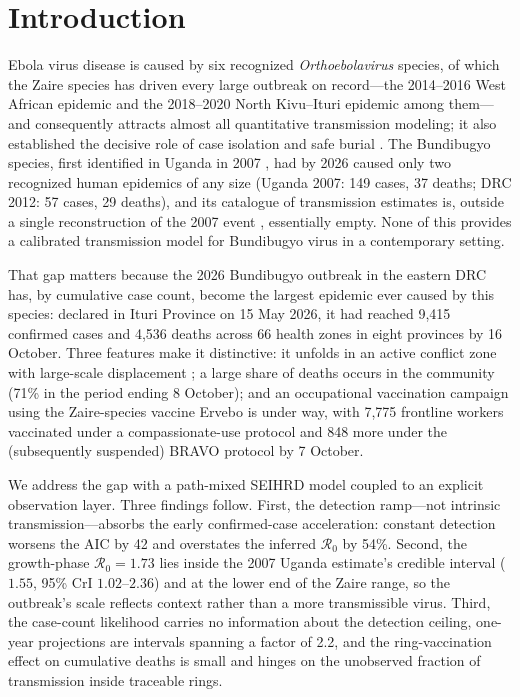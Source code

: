 \documentclass[10pt]{plos}
\newcommand{\Reff}{\mathcal{R}}
\begin{document}
\section{Introduction}\label{sec:intro}

Ebola virus disease is caused by six recognized \emph{Orthoebolavirus}
species, of which the Zaire species has driven every large outbreak on
record---the 2014--2016 West African epidemic and the 2018--2020 North
Kivu--Ituri epidemic among them---and consequently attracts almost all
quantitative transmission modeling; it also established the decisive
role of case isolation and safe burial \cite{Pandey2014,Kucharski2015,Merler2015,Meltzer2014}.
The Bundibugyo species, first identified in Uganda in 2007
\cite{Wamala2010}, had by 2026 caused only two recognized human
epidemics of any size (Uganda 2007: 149 cases, 37 deaths; DRC 2012: 57
cases, 29 deaths), and its catalogue of transmission estimates is,
outside a single reconstruction of the 2007 event \cite{DePadua2026},
essentially empty. None of this provides a calibrated transmission
model for Bundibugyo virus in a contemporary setting.

That gap matters because the 2026 Bundibugyo outbreak in the eastern DRC
has, by cumulative case count, become the largest epidemic ever caused
by this species: declared in Ituri Province on 15 May 2026, it had reached 9{,}415 confirmed cases and
4{,}536 deaths across 66 health zones in eight provinces by 16 October. Three features make it distinctive: it unfolds in an
active conflict zone with large-scale displacement \cite{SSHAP2026}; a
large share of deaths occurs in the community (71\%
in the period ending 8 October); and an
occupational vaccination campaign using the Zaire-species vaccine Ervebo
is under way, with 7{,}775 frontline workers vaccinated under a
compassionate-use protocol and 848 more under the (subsequently
suspended) BRAVO protocol by 7 October.

We address the gap with a path-mixed SEIHRD model coupled to an explicit
observation layer. Three findings follow. First, the detection
ramp---not intrinsic transmission---absorbs the early confirmed-case
acceleration: constant detection worsens the AIC by 42 and overstates
the inferred $\Reff_0$ by 54\%. Second, the growth-phase $\Reff_0=1.73$
lies inside the 2007 Uganda estimate's credible interval ($1.55$, 95\%
CrI $1.02$--$2.36$) and at the lower end of the Zaire range, so the
outbreak's scale reflects context rather than a more transmissible
virus. Third, the case-count likelihood carries no information about the
detection ceiling, one-year projections are intervals spanning a factor
of 2.2, and the ring-vaccination effect on cumulative deaths is small
and hinges on the unobserved fraction of transmission inside traceable
rings.
\end{document}
